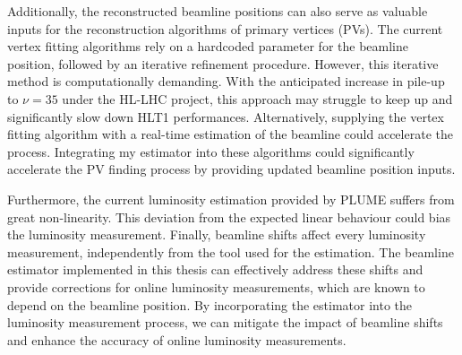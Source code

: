 Additionally, the reconstructed beamline positions can also serve as valuable inputs for the reconstruction algorithms of primary vertices (PVs). The current vertex fitting algorithms rely on a hardcoded parameter for the beamline position, followed by an iterative refinement procedure. However, this iterative method is computationally demanding. With the anticipated increase in pile-up to $\nu=35$ under the HL-LHC project, this approach may struggle to keep up and significantly slow down HLT1 performances. Alternatively, supplying the vertex fitting algorithm with a real-time estimation of the beamline could accelerate the process. Integrating my estimator into these algorithms could significantly accelerate the PV finding process by providing updated beamline position inputs.

Furthermore, the current luminosity estimation provided by PLUME suffers from great non-linearity. This deviation from the expected linear behaviour could bias the luminosity measurement. 
Finally, beamline shifts affect every luminosity measurement, independently from the tool used for the estimation. The beamline estimator implemented in this thesis can effectively address these shifts and provide corrections for online luminosity measurements, which are known to depend on the beamline position. By incorporating the estimator into the luminosity measurement process, we can mitigate the impact of beamline shifts and enhance the accuracy of online luminosity measurements.
